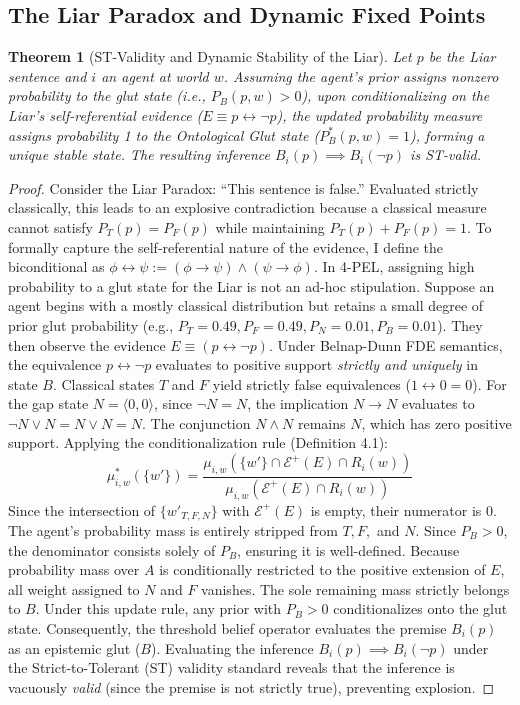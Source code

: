 \documentclass[11pt,a4paper]{article}
\newtheorem{theorem}{Theorem}[section]
\begin{document}
\subsection{The Liar Paradox and Dynamic Fixed Points}
\begin{theorem}[ST-Validity and Dynamic Stability of the Liar]
Let $p$ be the Liar sentence and $i$ an agent at world $w$. Assuming the agent's prior assigns nonzero probability to the glut state (i.e., $P_B(p, w) > 0$), upon conditionalizing on the Liar's self-referential evidence ($E \equiv p \leftrightarrow \neg p$), the updated probability measure assigns probability 1 to the Ontological Glut state ($P_B^*(p, w) = 1$), forming a unique stable state. The resulting inference $B_i(p) \implies B_i(\neg p)$ is ST-valid.
\end{theorem}
\begin{proof}
Consider the Liar Paradox: ``This sentence is false.'' Evaluated strictly classically, this leads to an explosive contradiction because a classical measure cannot satisfy $P_T(p) = P_F(p)$ while maintaining $P_T(p)+P_F(p)=1$. To formally capture the self-referential nature of the evidence, I define the biconditional as $\phi \leftrightarrow \psi := (\phi \to \psi) \land (\psi \to \phi)$.
In 4-PEL, assigning high probability to a glut state for the Liar is not an ad-hoc stipulation. Suppose an agent begins with a mostly classical distribution but retains a small degree of prior glut probability (e.g., $P_T=0.49, P_F=0.49, P_N=0.01, P_B=0.01$). They then observe the evidence $E \equiv (p \leftrightarrow \neg p)$. Under Belnap-Dunn FDE semantics, the equivalence $p \leftrightarrow \neg p$ evaluates to positive support \textit{strictly and uniquely} in state $B$. Classical states $T$ and $F$ yield strictly false equivalences ($1 \leftrightarrow 0 = 0$). For the gap state $N = \langle 0,0 \rangle$, since $\neg N = N$, the implication $N \to N$ evaluates to $\neg N \lor N = N \lor N = N$. The conjunction $N \land N$ remains $N$, which has zero positive support.
Applying the conditionalization rule (Definition 4.1):
\begin{equation*}
\mu_{i,w}^*(\{w'\}) = \frac{\mu_{i,w}(\{w'\} \cap \mathcal{E}^+(E) \cap R_i(w))}{\mu_{i,w}(\mathcal{E}^+(E) \cap R_i(w))}
\end{equation*}
Since the intersection of $\{w'_{T, F, N}\}$ with $\mathcal{E}^+(E)$ is empty, their numerator is $0$. The agent's probability mass is entirely stripped from $T, F,$ and $N$. Since $P_B > 0$, the denominator consists solely of $P_B$, ensuring it is well-defined. Because probability mass over $A$ is conditionally restricted to the positive extension of $E$, all weight assigned to $N$ and $F$ vanishes. The sole remaining mass strictly belongs to $B$. Under this update rule, any prior with $P_B > 0$ conditionalizes onto the glut state.
Consequently, the threshold belief operator evaluates the premise $B_i(p)$ as an epistemic glut ($B$). Evaluating the inference $B_i(p) \implies B_i(\neg p)$ under the Strict-to-Tolerant (ST) validity standard reveals that the inference is vacuously \textit{valid} (since the premise is not strictly true), preventing explosion.
\end{proof}
\end{document}
